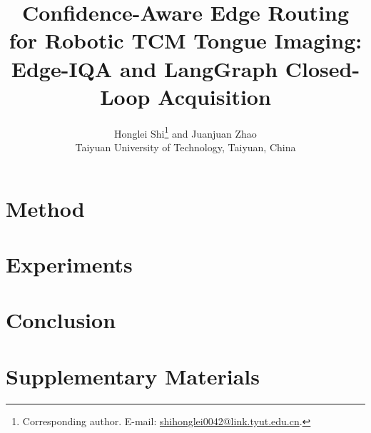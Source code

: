 \documentclass[11pt,twocolumn]{article}
\title{Confidence-Aware Edge Routing for Robotic TCM Tongue Imaging:\\
Edge-IQA and LangGraph Closed-Loop Acquisition}
\author{Honglei Shi\thanks{Corresponding author. E-mail: \href{mailto:shihonglei0042@link.tyut.edu.cn}{shihonglei0042@link.tyut.edu.cn}.} and Juanjuan Zhao\\
Taiyuan University of Technology, Taiyuan, China}
\date{}
\begin{document}
\maketitle





\section{Method}
\label{sec:method}





\section{Experiments}
\label{sec:experiments}






\section{Conclusion}







\appendix
\section{Supplementary Materials}
\label{sec:supp}




\end{document}
